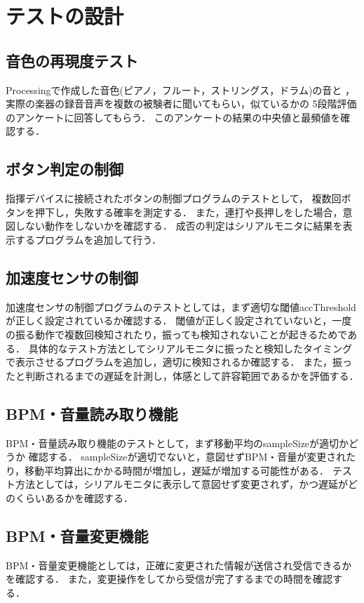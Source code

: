 \documentclass[lualatex,book,paper=a4paper,jafontsize=11.5pt,jafontscale=1.05]{jlreq}
\begin{document}
\section{テストの設計}
\subsection{音色の再現度テスト}
Processingで作成した音色(ピアノ，フルート，ストリングス，ドラム)の音と
，実際の楽器の録音音声を複数の被験者に聞いてもらい，似ているかの
5段階評価のアンケートに回答してもらう．
このアンケートの結果の中央値と最頻値を確認する．
\subsection{ボタン判定の制御}
指揮デバイスに接続されたボタンの制御プログラムのテストとして，
複数回ボタンを押下し，失敗する確率を測定する．
また，連打や長押しをした場合，意図しない動作をしないかを確認する．
成否の判定はシリアルモニタに結果を表示するプログラムを追加して行う．
\subsection{加速度センサの制御}
加速度センサの制御プログラムのテストとしては，まず適切な閾値accThresholdが正しく設定されているか確認する．
閾値が正しく設定されていないと，一度の振る動作で複数回検知されたり，振っても検知されないことが起きるためである．
具体的なテスト方法としてシリアルモニタに振ったと検知したタイミングで表示させるプログラムを追加し，適切に検知されるか確認する．
また，振ったと判断されるまでの遅延を計測し，体感として許容範囲であるかを評価する．

\subsection{BPM・音量読み取り機能}
BPM・音量読み取り機能のテストとして，まず移動平均のsampleSizeが適切かどうか
確認する．
sampleSizeが適切でないと，意図せずBPM・音量が変更されたり，移動平均算出にかかる時間が増加し，遅延が増加する可能性がある．
テスト方法としては，シリアルモニタに表示して意図せず変更されず，かつ遅延がどのくらいあるかを確認する．

\subsection{BPM・音量変更機能}
BPM・音量変更機能としては，正確に変更された情報が送信され受信できるかを確認する．
また，変更操作をしてから受信が完了するまでの時間を確認する．
\end{document}
